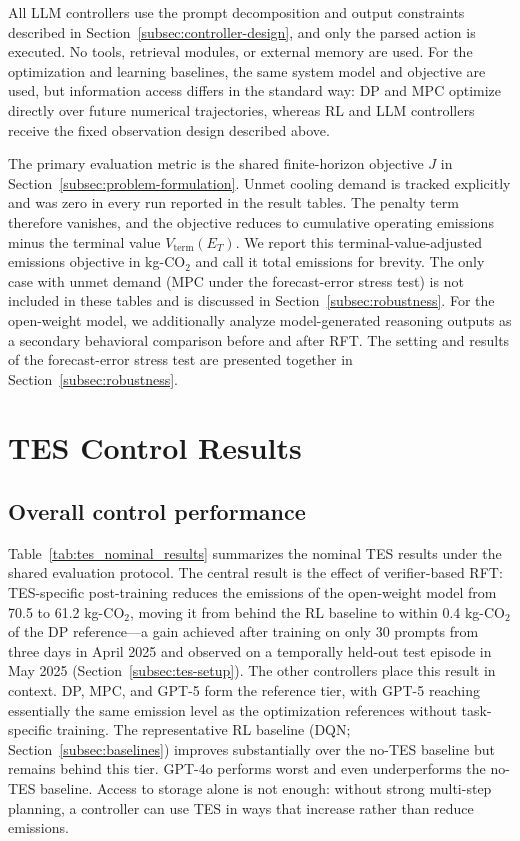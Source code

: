 \documentclass[11pt]{article}
\begin{document}
All LLM controllers use the prompt decomposition and output constraints described in Section~\ref{subsec:controller-design}, and only the parsed action is executed. No tools, retrieval modules, or external memory are used. For the optimization and learning baselines, the same system model and objective are used, but information access differs in the standard way: DP and MPC optimize directly over future numerical trajectories, whereas RL and LLM controllers receive the fixed observation design described above.

The primary evaluation metric is the shared finite-horizon objective $J$ in Section~\ref{subsec:problem-formulation}. Unmet cooling demand is tracked explicitly and was zero in every run reported in the result tables. The penalty term therefore vanishes, and the objective reduces to cumulative operating emissions minus the terminal value $V_{\mathrm{term}}(E_T)$. We report this terminal-value-adjusted emissions objective in kg-CO$_2$ and call it total emissions for brevity. The only case with unmet demand (MPC under the forecast-error stress test) is not included in these tables and is discussed in Section~\ref{subsec:robustness}. For the open-weight model, we additionally analyze model-generated reasoning outputs as a secondary behavioral comparison before and after RFT. The setting and results of the forecast-error stress test are presented together in Section~\ref{subsec:robustness}.

\section{TES Control Results}\label{sec:tes-results}
\subsection{Overall control performance}\label{subsec:overall-performance}
Table~\ref{tab:tes_nominal_results} summarizes the nominal TES results under the shared evaluation protocol. The central result is the effect of verifier-based RFT: TES-specific post-training reduces the emissions of the open-weight model from 70.5 to 61.2 kg-CO$_2$, moving it from behind the RL baseline to within 0.4 kg-CO$_2$ of the DP reference---a gain achieved after training on only 30 prompts from three days in April 2025 and observed on a temporally held-out test episode in May 2025 (Section~\ref{subsec:tes-setup}). The other controllers place this result in context. DP, MPC, and GPT-5 form the reference tier, with GPT-5 reaching essentially the same emission level as the optimization references without task-specific training. The representative RL baseline (DQN; Section~\ref{subsec:baselines}) improves substantially over the no-TES baseline but remains behind this tier. GPT-4o performs worst and even underperforms the no-TES baseline. Access to storage alone is not enough: without strong multi-step planning, a controller can use TES in ways that increase rather than reduce emissions.
\end{document}
